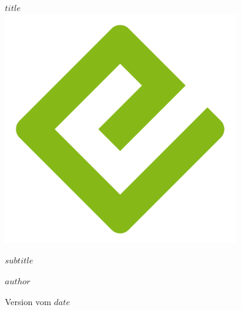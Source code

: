 \begin{titlepage}

  \begin{center}
  $title$\\
  \includegraphics[width=100mm]{cover.png}

  \vspace{10mm}
  \begin{minipage}[]{0.85\textwidth}
    \begin{center}
      {\color{HSNRblue1}
      \Huge $subtitle$
      }
    \end{center}
  \end{minipage}

  \vspace{6mm}

  \normalsize $author$

  \vfill
  \footnotesize Version vom $date$
  \end{center}

\thispagestyle{empty}
\end{titlepage}
\pagestyle{fancy}
\fancyhead[L]{\leftmark}  %
\renewcommand{\headrulewidth}{0.4pt}
\renewcommand{\footrulewidth}{0.4pt}
